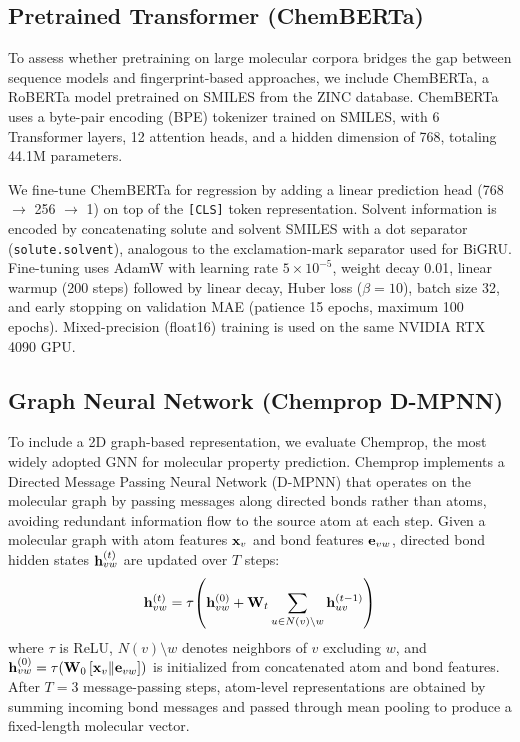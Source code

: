 \subsection{Pretrained Transformer (ChemBERTa)}
\label{sec:chemberta}

To assess whether pretraining on large molecular corpora bridges the gap between sequence models and fingerprint-based approaches, we include ChemBERTa\cite{chithrananda2020chemberta}, a RoBERTa\cite{liu2019roberta} model pretrained on SMILES from the ZINC database\cite{irwin2005zinc}.
ChemBERTa uses a byte-pair encoding (BPE) tokenizer trained on SMILES, with 6 Transformer layers, 12 attention heads, and a hidden dimension of 768, totaling 44.1M parameters.

We fine-tune ChemBERTa for regression by adding a linear prediction head (768 $\to$ 256 $\to$ 1) on top of the \texttt{[CLS]} token representation.
Solvent information is encoded by concatenating solute and solvent SMILES with a dot separator (\texttt{solute.solvent}), analogous to the exclamation-mark separator used for BiGRU.
Fine-tuning uses AdamW\cite{loshchilov2019decoupled} with learning rate $5 \times 10^{-5}$, weight decay 0.01, linear warmup (200 steps) followed by linear decay, Huber loss ($\beta = 10$), batch size 32, and early stopping on validation MAE (patience 15 epochs, maximum 100 epochs).
Mixed-precision (float16) training is used on the same NVIDIA RTX 4090 GPU.


\subsection{Graph Neural Network (Chemprop D-MPNN)}
\label{sec:chemprop}

To include a 2D graph-based representation, we evaluate Chemprop\cite{yangAnalyzingLearnedMolecular2019}, the most widely adopted GNN for molecular property prediction.
Chemprop implements a Directed Message Passing Neural Network (D-MPNN) that operates on the molecular graph by passing messages along directed bonds rather than atoms, avoiding redundant information flow to the source atom at each step.
Given a molecular graph with atom features $\mathbf{x}_v$ and bond features $\mathbf{e}_{vw}$, directed bond hidden states $\mathbf{h}_{vw}^{(t)}$ are updated over $T$ steps:
\begin{equation}
    \mathbf{h}_{vw}^{(t)} = \tau\!\left(\mathbf{h}_{vw}^{(0)} + \mathbf{W}_t \sum_{u \in N(v) \setminus w} \mathbf{h}_{uv}^{(t-1)}\right)
\end{equation}
where $\tau$ is ReLU, $N(v) \setminus w$ denotes neighbors of $v$ excluding $w$, and $\mathbf{h}_{vw}^{(0)} = \tau(\mathbf{W}_0 \, [\mathbf{x}_v \| \mathbf{e}_{vw}])$ is initialized from concatenated atom and bond features.
After $T = 3$ message-passing steps, atom-level representations are obtained by summing incoming bond messages and passed through mean pooling to produce a fixed-length molecular vector.

